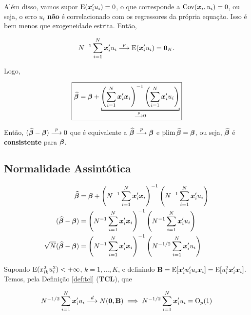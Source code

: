 \documentclass[11pt, oneside, a4paper, article]{article}
\numberwithin{equation}{section}
\begin{document}
Além disso, vamos supor $\text{E}(\boldsymbol{x}_{i}' u_{i}) = 0$, o que corresponde a $\text{Cov}(\boldsymbol{x}_{i}, u_{i}) = 0$, ou seja, o erro $u_{i}$ \textbf{não} é correlacionado com os regressores da própria equação.
Isso é bem menos que exogeneidade estrita.
Então, 

\vspace{-1 em}
\begin{align*}
	N^{-1} \sum_{i=1}^{N} \boldsymbol{x}_{i}' u_{i}  \overset{p}{\longrightarrow}  \text{E}(\boldsymbol{x}_{i}' u_{i}) = \boldsymbol{0}_{K}.
\end{align*}

Logo,

\vspace{-1 em}
\begin{align*}
	\boxed{
		\betahatbold = 
		\betavec +
		\underbracket[1pt]{
			\left( \sum_{i=1}^{N} \xvec_{i}' \xvec_{i} \right)^{-1}
		\left( \sum_{i=1}^{N} \xvec_{i}' u_{i} \right)}_{\arrowp 0}
	}
\end{align*}

Então, 
$(\widehat{\boldsymbol{\beta}} - \boldsymbol{\beta})  \overset{p}{\longrightarrow}  0$ 
que é equivalente a 
$\widehat{\boldsymbol{\beta}}  \overset{p}{\longrightarrow}  \boldsymbol{\beta}$ e 
$\text{plim} \,\widehat{\boldsymbol{\beta}} = \boldsymbol{\beta}$,
ou seja, $\widehat{\boldsymbol{\beta}}$ é \textbf{consistente} para $\boldsymbol{\beta}$.

\subsection{Normalidade Assintótica} %

\vspace{-2 em}
\begin{align*}
	\widehat{\boldsymbol{\beta}} 
	&= 
	\boldsymbol{\beta} +
	\left( N^{-1} \sum_{i=1}^{N} \boldsymbol{x}_{i}' \boldsymbol{x}_{i} \right)^{-1}
	\left( N^{-1} \sum_{i=1}^{N} \boldsymbol{x}_{i}' u_{i} \right)
	\\
	(\widehat{\boldsymbol{\beta}} - \boldsymbol{\beta})
	&=
	\left( N^{-1} \sum_{i=1}^{N} \boldsymbol{x}_{i}' \boldsymbol{x}_{i} \right)^{-1}
	\left( N^{-1} \sum_{i=1}^{N} \boldsymbol{x}_{i}' u_{i} \right)
	\\
	\sqrt{N} (\widehat{\boldsymbol{\beta}} - \boldsymbol{\beta}) &=
	\left( N^{-1} \sum_{i=1}^{N} \boldsymbol{x}_{i}' \boldsymbol{x}_{i} \right)^{-1}
	\left( N^{-1/2} \sum_{i=1}^{N} \boldsymbol{x}_{i}' u_{i} \right)
\end{align*}

\noindent
Supondo
$\text{E}( x_{ik}^{2} u_{i}^{2} ) < + \infty$,
$k=1, \dots, K$, e definindo
$\mathbf{B} = \text{E}[\boldsymbol{x}_{i}' u_{i}' u_{i} \boldsymbol{x}_{i}] = \text{E}[ u_{i}^2 \boldsymbol{x}_{i}' \boldsymbol{x}_{i} ]$.
Temos, pela Definição \ref{def:tcl} (\textbf{TCL}), que

\vspace{-1 em}
\begin{align} \label{eq:limxu}
	N^{-1/2} \sum_{i=1}^{N} \boldsymbol{x}_{i}' u_{i}  \overset{d}{\longrightarrow}  N(\boldsymbol{0}, \mathbf{B})
	\implies
	N^{-1/2} \sum_{i=1}^{N} \boldsymbol{x}_{i}' u_{i} = \text{O}_{p}(1)
\end{align}
\end{document}
